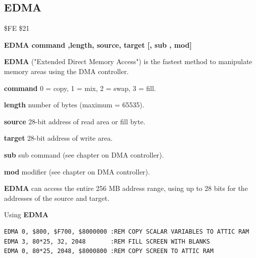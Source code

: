 \subsection{EDMA}
\label{BASIC 65 Commands!EDMA}
\begin{description}[leftmargin=2cm,style=nextline]
\item [Token:] \$FE \$21
\item [Format:] {\bf EDMA command ,length, source,
                 target [, sub , mod]}
\item [Usage:]
   {\bf EDMA} ("Extended Direct Memory Access") is the fastest method
   to manipulate memory areas using the DMA controller.

   {\bf command} 0 = copy, 1 = mix, 2 = swap, 3 = fill.

   {\bf length} number of bytes (maximum = 65535).

   {\bf source}  28-bit address of read area or fill byte.

   {\bf target} 28-bit address of write area.

   {\bf sub} sub command (see chapter on DMA controller).

   {\bf mod} modifier (see chapter on DMA controller).

\item [Remarks:]
{\bf EDMA} can access the entire 256 MB address range,
using up to 28 bits for the addresses of the source and target.
\item [Examples:] Using {\bf EDMA}
\begin{tcolorbox}[colback=black,coltext=white]
\verbatimfont{\codefont}
\begin{verbatim}
EDMA 0, $800, $F700, $8000000 :REM COPY SCALAR VARIABLES TO ATTIC RAM
EDMA 3, 80*25, 32, 2048       :REM FILL SCREEN WITH BLANKS
EDMA 0, 80*25, 2048, $8000800 :REM COPY SCREEN TO ATTIC RAM
\end{verbatim}
\end{tcolorbox}
\end{description}


\newpage

